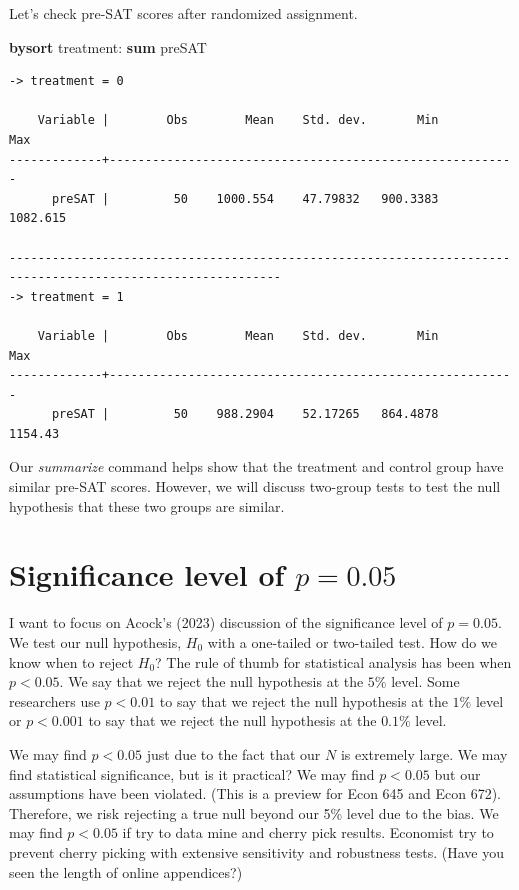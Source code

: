 \documentclass[
]{book}
\newenvironment{Shaded}{\begin{snugshade}}{\end{snugshade}}
\newcommand{\KeywordTok}[1]{\textcolor[rgb]{0.13,0.29,0.53}{\textbf{#1}}}
\newcommand{\NormalTok}[1]{#1}
\begin{document}
Let's check pre-SAT scores after randomized assignment.

\begin{Shaded}
\begin{Highlighting}[]
\KeywordTok{bysort}\NormalTok{ treatment: }\KeywordTok{sum}\NormalTok{ preSAT}
\end{Highlighting}
\end{Shaded}

\begin{verbatim}
-> treatment = 0

    Variable |        Obs        Mean    Std. dev.       Min        Max
-------------+---------------------------------------------------------
      preSAT |         50    1000.554    47.79832   900.3383   1082.615

------------------------------------------------------------------------------------------------------------
-> treatment = 1

    Variable |        Obs        Mean    Std. dev.       Min        Max
-------------+---------------------------------------------------------
      preSAT |         50    988.2904    52.17265   864.4878    1154.43
\end{verbatim}

Our \emph{summarize} command helps show that the treatment and control group have similar pre-SAT scores. However, we will discuss two-group tests to test the null hypothesis that these two groups are similar.

\section{\texorpdfstring{Significance level of \(p=0.05\)}{Significance level of p=0.05}}\label{significance-level-of-p0.05}

I want to focus on Acock's (2023) discussion of the significance level of \(p=0.05\). We test our null hypothesis, \(H_0\) with a one-tailed or two-tailed test. How do we know when to reject \(H_0\)? The rule of thumb for statistical analysis has been when \(p < 0.05\). We say that we reject the null hypothesis at the \(5\%\) level. Some researchers use \(p < 0.01\) to say that we reject the null hypothesis at the \(1\%\) level or \(p < 0.001\) to say that we reject the null hypothesis at the \(0.1\%\) level.

We may find \(p < 0.05\) just due to the fact that our \(N\) is extremely large. We may find statistical significance, but is it practical? We may find \(p < 0.05\) but our assumptions have been violated. (This is a preview for Econ 645 and Econ 672). Therefore, we risk rejecting a true null beyond our 5\% level due to the bias. We may find \(p < 0.05\) if try to data mine and cherry pick results. Economist try to prevent cherry picking with extensive sensitivity and robustness tests. (Have you seen the length of online appendices?)
\end{document}
